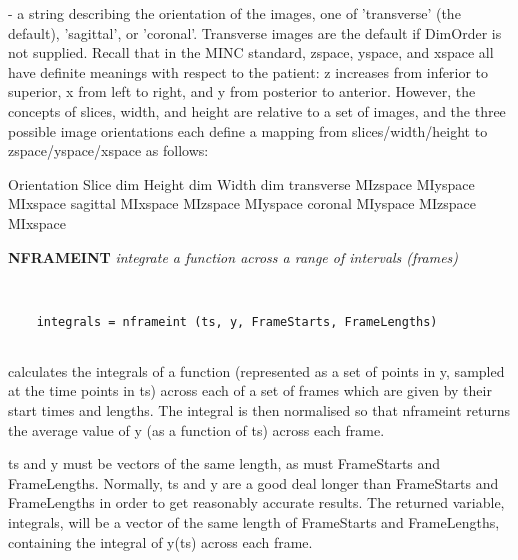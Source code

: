\begin{description}
\item {}   - a string describing the orientation of the images,
                 one of 'transverse' (the default), 'sagittal', or
                 'coronal'.  Transverse images are the default if
                 DimOrder is not supplied.  Recall that in the MINC
                 standard, zspace, yspace, and xspace all have
                 definite meanings with respect to the patient: z
                 increases from inferior to superior, x from left to
                 right, and y from posterior to anterior.  However,
                 the concepts of slices, width, and height are
                 relative to a set of images, and the three possible 
                 image orientations each define a mapping from
                 slices/width/height to zspace/yspace/xspace as
                 follows:
\end{description}
 
                     Orientation  Slice dim    Height dim   Width dim
                      transverse   MIzspace     MIyspace     MIxspace
                      sagittal     MIxspace     MIzspace     MIyspace
                      coronal      MIyspace     MIzspace     MIxspace
\endfunchelp


{\large\bf NFRAMEINT} {\em   integrate a function across a range of intervals (frames)}
\begin{verbatim}


    integrals = nframeint (ts, y, FrameStarts, FrameLengths)


\end{verbatim}

  calculates the integrals of a function (represented as a set of points
  in y, sampled at the time points in ts) across each of a set of frames
  which are given by their start times and lengths.  The integral is then
  normalised so that nframeint returns the average value of y (as a function
  of ts) across each frame.
 
  ts and y must be vectors of the same length, as must FrameStarts and 
  FrameLengths.  Normally, ts and y are a good deal longer than
  FrameStarts and FrameLengths in order to get reasonably accurate 
  results.  The returned variable, integrals, will be a vector of
  the same length of FrameStarts and FrameLengths, containing the 
  integral of y(ts) across each frame.
 
